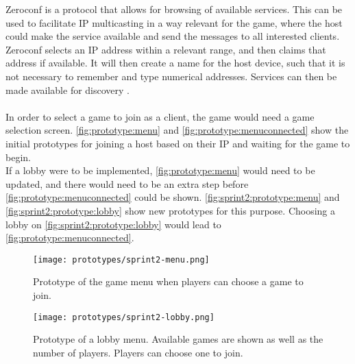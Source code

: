 Zeroconf is a protocol that allows for browsing of available services.
This can be used to facilitate IP multicasting in a way relevant for the game, where the host could make the service available and send the messages to all interested clients.
Zeroconf selects an IP address within a relevant range, and then claims that address if available.
It will then create a name for the host device, such that it is not necessary to remember and type numerical addresses.
Services can then be made available for discovery \cite{zeroconf}.
\\\\
In order to select a game to join as a client, the game would need a game selection screen.
\autoref{fig:prototype:menu} and \autoref{fig:prototype:menuconnected} show the initial prototypes for joining a host based on their IP and waiting for the game to begin.\\
If a lobby were to be implemented, \autoref{fig:prototype:menu} would need to be updated, and there would need to be an extra step before \autoref{fig:prototype:menuconnected} could be shown.
\autoref{fig:sprint2:prototype:menu} and \autoref{fig:sprint2:prototype:lobby} show new prototypes for this purpose.
Choosing a lobby on \autoref{fig:sprint2:prototype:lobby} would lead to \autoref{fig:prototype:menuconnected}.
\begin{figure}[H]
    \centering
    \texttt{[image: prototypes/sprint2-menu.png]}
    \caption{Prototype of the game menu when players can choose a game to join.}
    \label{fig:sprint2:prototype:menu}
\end{figure}

\begin{figure}[H]
    \centering
    \texttt{[image: prototypes/sprint2-lobby.png]}
    \caption{Prototype of a lobby menu. Available games are shown as well as the number of players. Players can choose one to join.}
    \label{fig:sprint2:prototype:lobby}
\end{figure}
